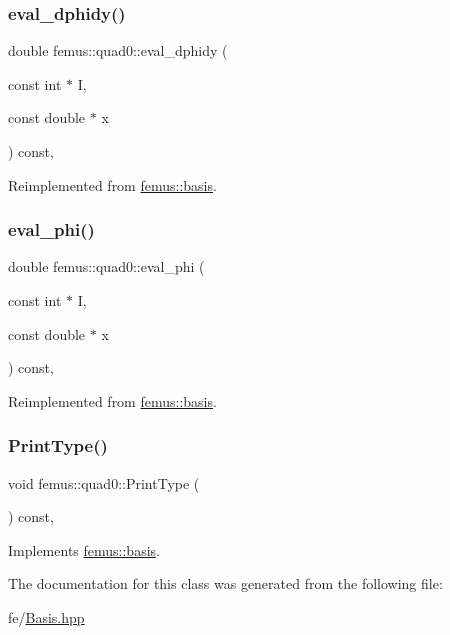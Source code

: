 \subsubsection{\texorpdfstring{eval\+\_\+dphidy()}{eval\_dphidy()}}
{\footnotesize\ttfamily double femus\+::quad0\+::eval\+\_\+dphidy (\begin{DoxyParamCaption}\item[{const int $\ast$}]{I,  }\item[{const double $\ast$}]{x }\end{DoxyParamCaption}) const\hspace{0.3cm}{\ttfamily [inline]}, {\ttfamily [virtual]}}



Reimplemented from \mbox{\hyperlink{classfemus_1_1basis_a2819fac9aae797156b9efec8a0b85cc1}{femus\+::basis}}.

\mbox{\label{classfemus_1_1quad0_a65b24fd1a96cf9df09f570ca222b84e5}} 
\subsubsection{\texorpdfstring{eval\+\_\+phi()}{eval\_phi()}}
{\footnotesize\ttfamily double femus\+::quad0\+::eval\+\_\+phi (\begin{DoxyParamCaption}\item[{const int $\ast$}]{I,  }\item[{const double $\ast$}]{x }\end{DoxyParamCaption}) const\hspace{0.3cm}{\ttfamily [inline]}, {\ttfamily [virtual]}}



Reimplemented from \mbox{\hyperlink{classfemus_1_1basis_a89b0797cdccffae5ff6d059b32016ae5}{femus\+::basis}}.

\mbox{\label{classfemus_1_1quad0_a8dd7e0be853baa57c6ad824aeb086b79}} 
\subsubsection{\texorpdfstring{Print\+Type()}{PrintType()}}
{\footnotesize\ttfamily void femus\+::quad0\+::\+Print\+Type (\begin{DoxyParamCaption}{ }\end{DoxyParamCaption}) const\hspace{0.3cm}{\ttfamily [inline]}, {\ttfamily [virtual]}}



Implements \mbox{\hyperlink{classfemus_1_1basis_abbae7bf8f31ec5793c911bc6d4ea0572}{femus\+::basis}}.



The documentation for this class was generated from the following file\+:\begin{DoxyCompactItemize}
\item 
fe/\mbox{\hyperlink{_basis_8hpp}{Basis.\+hpp}}\end{DoxyCompactItemize}
